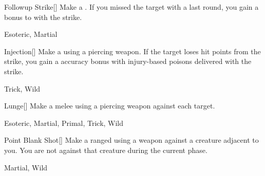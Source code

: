 \lowercase{\hypertarget{maneuver:Followup Strike}{}}\label{maneuver:Followup Strike}
\hypertarget{maneuver:Followup Strike}{}
\begin{freeability}[Rank 2]{Followup Strike}[]
Make a .
If you missed the target with a  last round, you gain a  bonus to  with the strike.


 Esoteric, Martial
\end{freeability}
\vspace{0.25em}



\lowercase{\hypertarget{maneuver:Injection}{}}\label{maneuver:Injection}
\hypertarget{maneuver:Injection}{}
\begin{freeability}[Rank 2]{Injection}[]
Make a  using a piercing weapon.
If the target loses hit points from the strike, you gain a  accuracy bonus with injury-based poisons delivered with the strike.


 Trick, Wild
\end{freeability}
\vspace{0.25em}



\lowercase{\hypertarget{maneuver:Lunge}{}}\label{maneuver:Lunge}
\hypertarget{maneuver:Lunge}{}
\begin{freeability}[Rank 2]{Lunge}[]
Make a melee  using a piercing weapon against each target.


 Esoteric, Martial, Primal, Trick, Wild
\end{freeability}
\vspace{0.25em}



\lowercase{\hypertarget{maneuver:Point Blank Shot}{}}\label{maneuver:Point Blank Shot}
\hypertarget{maneuver:Point Blank Shot}{}
\begin{freeability}[Rank 2]{Point Blank Shot}[]
Make a ranged  using a  weapon against a creature adjacent to you.
You are not  against that creature during the current phase.


 Martial, Wild
\end{freeability}
\vspace{0.25em}



